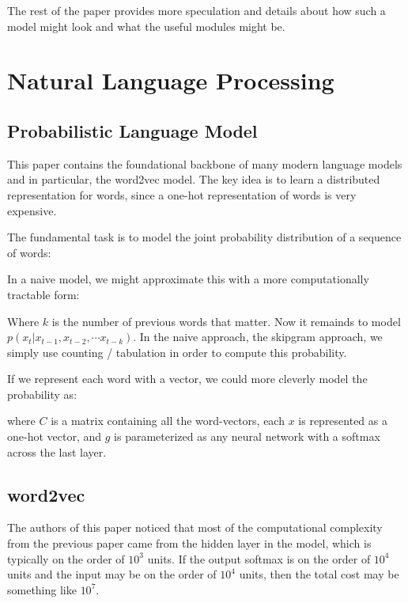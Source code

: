 \documentclass[12pt]{article}
\begin{document}
The rest of the paper provides more speculation and details about how such a model might look and what the useful modules might be. 

\section{Natural Language Processing}

\subsection{Probabilistic Language Model \cite{ProbabilisticLanguageModel}}

This paper contains the foundational backbone of many modern language models and in particular, the word2vec model. The key idea is to learn a distributed representation for words, since a one-hot representation of words is very expensive. 

The fundamental task is to model the joint probability distribution of a sequence of words:


In a naive model, we might approximate this with a more computationally tractable form:


Where $k$ is the number of previous words that matter. Now it remainds to model $p(x_t | x_{t-1}, x_{t-2}, \cdots x_{t-k})$. In the naive approach, the skipgram approach, we simply use counting / tabulation in order to compute this probability.

If we represent each word with a vector, we could more cleverly model the probability as:


where $C$ is a matrix containing all the word-vectors, each $x$ is represented as a one-hot vector, and $g$ is parameterized as any neural network with a softmax across the last layer.

\subsection{word2vec \cite{word2vec}}

The authors of this paper noticed that most of the computational complexity from the previous paper came from the hidden layer in the model, which is typically on the order of $10^3$ units. If the output softmax is on the order of $10^4$ units and the input may be on the order of $10^4$ units, then the total cost may be something like $10^7$.
\end{document}
